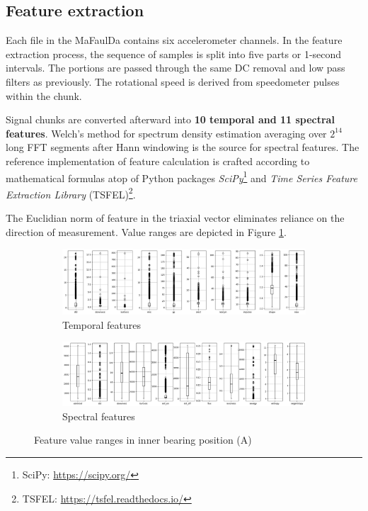 \subsection{Feature extraction}
Each file in the MaFaulDa contains six accelerometer channels. In the feature extraction process, the sequence of samples is split into five parts or 1-second intervals. The portions are passed through the same DC removal and low pass filters as previously. The rotational speed is derived from speedometer pulses within the chunk.

Signal chunks are converted afterward into \textbf{10 temporal and 11 spectral features}. Welch's method for spectrum density estimation averaging over $2^{14}$ long FFT segments after Hann windowing is the source for spectral features. The reference implementation of feature calculation is crafted according to mathematical formulas atop of Python packages \emph{SciPy}\footnote{SciPy: \url{https://scipy.org/}} and \emph{Time Series Feature Extraction Library} (TSFEL)\footnote{TSFEL: \url{https://tsfel.readthedocs.io/}}.

The Euclidian norm of feature in the triaxial vector eliminates reliance on the direction of measurement. Value ranges are depicted in Figure \ref{fig:design:feature-range}. 


\begin{figure}[ht]
    \centering
    \begin{subfigure}[b]{\textwidth}
        \includegraphics[width=\textwidth]{assets/design/feature-range-temporal.png}
        \caption{Temporal features}
    \end{subfigure}
    \hfill
    \begin{subfigure}[b]{\textwidth}
        \includegraphics[width=\textwidth]{assets/design/feature-range-spectral.png}
        \caption{Spectral features}
    \end{subfigure}
    \caption{Feature value ranges in inner bearing position (A)}
    \label{fig:design:feature-range}
\end{figure}


